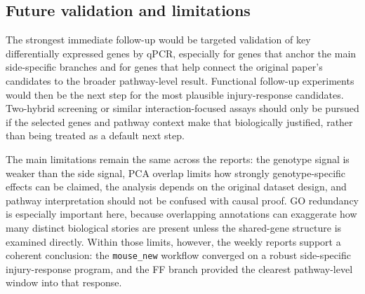 \documentclass[12pt]{article}
\DeclareRobustCommand{\artifact}[1]{\texttt{#1}}
\begin{document}
\subsection{Future validation and limitations}

The strongest immediate follow-up would be targeted validation of key differentially expressed genes by qPCR, especially for genes that anchor the main side-specific branches and for genes that help connect the original paper’s candidates to the broader pathway-level result. Functional follow-up experiments would then be the next step for the most plausible injury-response candidates. Two-hybrid screening or similar interaction-focused assays should only be pursued if the selected genes and pathway context make that biologically justified, rather than being treated as a default next step.

The main limitations remain the same across the reports: the genotype signal is weaker than the side signal, PCA overlap limits how strongly genotype-specific effects can be claimed, the analysis depends on the original dataset design, and pathway interpretation should not be confused with causal proof. GO redundancy is especially important here, because overlapping annotations can exaggerate how many distinct biological stories are present unless the shared-gene structure is examined directly. Within those limits, however, the weekly reports support a coherent conclusion: the \artifact{mouse\_new} workflow converged on a robust side-specific injury-response program, and the FF branch provided the clearest pathway-level window into that response.

\printbibliography[title={References}]
\end{document}
